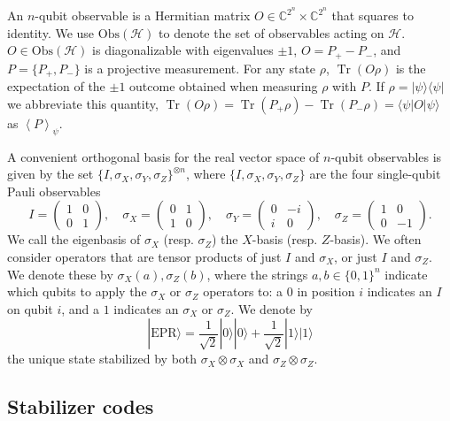 \documentclass[11pt,letterpaper]{article}
\newcommand{\<}{\langle}
\renewcommand{\>}{\rangle}
\newcommand{\setft}[1]{\mathrm{#1}}
\newcommand{\bra}[1]{\< #1 |}
\newcommand{\ket}[1]{| #1 \>}
\newcommand{\mH}{\mathcal{H}}
\DeclareMathOperator{\Tr}{Tr}
\newcommand{\avg}[2]{\left\langle #1 \right\rangle_{#2}}
\newcommand{\C}{\mathbb{C}}
\newcommand{\EPR}{\mathrm{EPR}}
\newcommand{\Obs}{\setft{Obs}}
\begin{document}
An $n$-qubit observable is a Hermitian matrix
$O\in \C^{2^n}\times\C^{2^n}$ that squares to identity. We use $\Obs(\mH)$ to denote the set of observables acting on $\mH$. $O\in\Obs(\mH)$ is
diagonalizable with eigenvalues $\pm 1$, $O=P_+-P_-$, and
$P=\{P_+,P_-\}$ is a projective measurement. For any state $\rho$,
$\Tr(O\rho)$ is the expectation of the $\pm 1$ outcome obtained when
measuring $\rho$ with $P$. If $\rho = \ket{\psi}\bra{\psi}$ we
abbreviate this quantity,
$\Tr(O\rho) = \Tr(P_+\rho)-\Tr(P_-\rho) = \langle \psi | O | \psi
\rangle$ as $\avg{P}{\psi}$.

A convenient orthogonal basis for the real vector space of $n$-qubit observables is given by the set $\{I,\sigma_X,\sigma_Y,\sigma_Z\}^{\otimes n}$, where $\{I,\sigma_X,\sigma_Y,\sigma_Z\}$ are the four single-qubit Pauli observables
\begin{equation}\label{eq:pauli-def}
 I = \begin{pmatrix} 1 & 0 \\ 0 & 1 \end{pmatrix},\quad
\sigma_X= \begin{pmatrix} 0 & 1 \\ 1 & 0 \end{pmatrix}, \quad \sigma_Y = \begin{pmatrix} 0
  & -i \\ i & 0\end{pmatrix}, \quad \sigma_Z = \begin{pmatrix} 1 & 0 \\ 0 &
  -1\end{pmatrix} .
	\end{equation}
We call the eigenbasis of $\sigma_X$ (resp. $\sigma_Z$) the $X$-basis (resp. $Z$-basis). 
We 
often consider operators that are tensor products of just
$I$ and $\sigma_X$, or just $I$ and $\sigma_Z$. We denote these by $\sigma_X(a), \sigma_Z(b)$, where
the strings $a, b \in \{0, 1\}^n$ indicate which qubits to apply the
$\sigma_X$ or $\sigma_Z$ operators to: a $0$ in position $i$ indicates an $I$ on
qubit $i$, and a $1$ indicates an $\sigma_X$ or $\sigma_Z$. 
We denote by 
$$\ket{\EPR} = \frac{1}{\sqrt{2}} \ket{0}\ket{0} + \frac{1}{\sqrt{2}}\ket{1}\ket{1}$$
the unique state stabilized by both $\sigma_X\otimes\sigma_X$ and
$\sigma_Z\otimes \sigma_Z$. 


\subsection{Stabilizer codes}
\label{sec:stabilizer}
\end{document}
